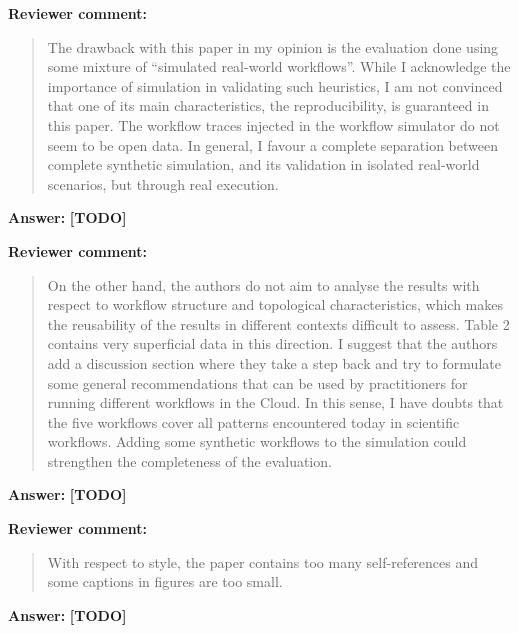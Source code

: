 \documentclass{letter}
\newenvironment{review}%
{\textbf{Reviewer comment:}\begin{quote}}%
{\end{quote}}%
\newcommand{\todo}[1]{%
      \color{red}\textbf{[TODO]} #1\color{black}}
\newcommand{\answer}[1]{%
      \textbf{Answer:} #1}
\begin{document}
\begin{letter}{}
\begin{review}
The drawback with this paper in my opinion is the evaluation done using some mixture of ``simulated real-world workflows''. While I acknowledge the importance of simulation in validating such heuristics, I am not convinced that one of its main characteristics, the reproducibility, is guaranteed in this paper. The workflow traces injected in the workflow simulator do not seem to be open data. In general, I favour a complete separation between complete synthetic simulation, and its validation in isolated real-world scenarios, but through real execution. 
\end{review}

\answer{\todo{}}



\begin{review}
On the other hand, the authors do not aim to analyse the results with respect to workflow structure and topological characteristics, which makes the reusability of the results in different contexts difficult to assess. Table 2 contains very superficial data in this direction. I suggest that the authors add a discussion section where they take a step back and try to formulate some general recommendations that can be used by practitioners for running different workflows in the Cloud. In this sense, I have doubts that the five workflows cover all patterns encountered today in scientific workflows. Adding some synthetic workflows to the simulation could strengthen the completeness of the evaluation.
\end{review}

\answer{\todo{}}



\begin{review}
With respect to style, the paper contains too many self-references and some captions in figures are too small.
\end{review}

\answer{\todo{}}



\end{letter}
\end{document}
